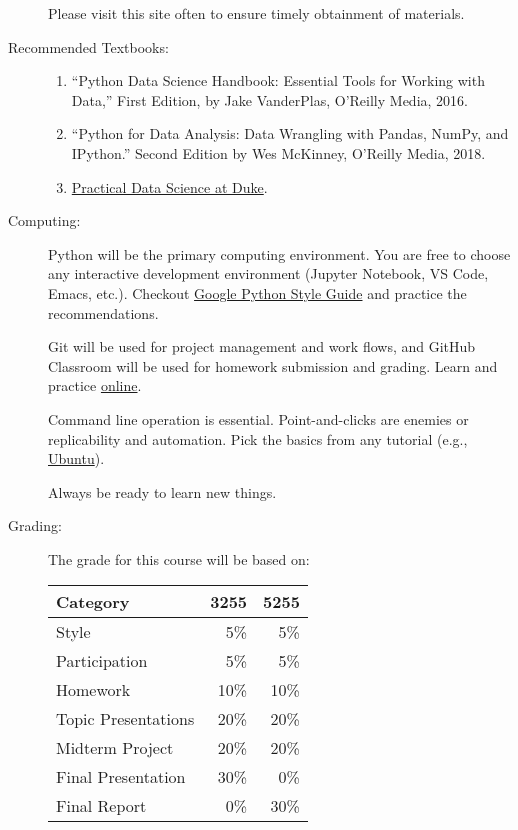 \documentclass{article}
\let\proglang=\textsf
\begin{document}
\begin{multicols}{2}
\begin{description}
  Please visit this site often to ensure timely obtainment of materials.
  
\item[Recommended Textbooks:]\hspace{0pt}
  \begin{enumerate}
  \item 
    ``Python Data Science Handbook: Essential Tools for Working with
    Data,'' First Edition, by Jake VanderPlas, O’Reilly Media, 2016.
 
  \item
    ``Python for Data Analysis: Data Wrangling with Pandas, NumPy, and
    IPython.''  Second Edition by Wes McKinney, O’Reilly Media, 2018.
  \item
    \href{https://www.practicaldatascience.org/html/not_a_mids_student.html}{Practical
    Data Science at Duke}.
  \end{enumerate}

\item[Computing:]
  \proglang{Python} will be the primary computing environment. You are
  free to choose any interactive development environment (Jupyter
  Notebook, VS Code, Emacs, etc.). Checkout
  \href{https://google.github.io/styleguide/pyguide.html}{Google
    Python Style Guide} and practice the recommendations.

  Git will be used for project management and work flows, and GitHub
  Classroom will be used for homework submission and grading. Learn
  and practice \href{https://gitexercises.fracz.com}{online}.

  Command line operation is essential. Point-and-clicks are enemies or
  replicability and automation. Pick the basics from any tutorial
  (e.g.,
  \href{https://ubuntu.com/tutorials/command-line-for-beginners}{Ubuntu}).

  Always be ready to learn new things.

\item[Grading:]
The grade for this course will be based on:
\begin{center}
  \begin{tabular}{lrr}
    \toprule
    Category                & 3255   & 5255\\
    \midrule
    Style                       &  5\%   & 5\%\\
    Participation           &  5\%   & 5\%\\
    Homework              &  10\% & 10\%\\
    Topic Presentations&  20\% & 20\%\\
    Midterm Project       &  20\% & 20\%\\
    Final Presentation    &  30\% & 0\%\\
    Final Report             &  0\% & 30\%\\
    \bottomrule
  \end{tabular}
\end{center} 


\end{description}
\end{multicols}
\end{document}
